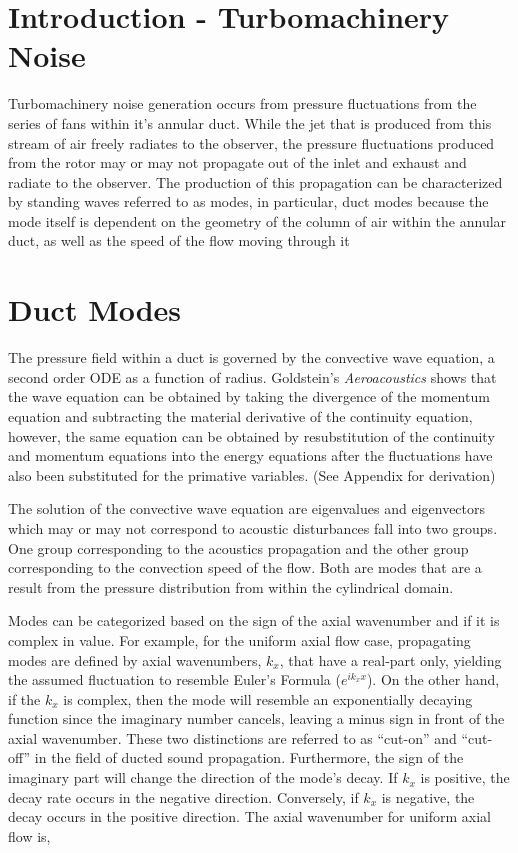 \documentclass[a4paper]{report}
\begin{document}
\section{Introduction - Turbomachinery Noise}
Turbomachinery noise generation occurs from pressure fluctuations from the series 
of fans within it's annular duct. While the jet that is produced from this stream
of air freely radiates to the observer, the pressure fluctuations 
produced from the rotor may or may not propagate out of the inlet and exhaust and 
radiate to the observer. The production of this propagation can be characterized
by standing waves referred to as modes, in particular, duct modes because 
the mode itself is dependent on the geometry of the column of air within the 
annular duct, as well as the speed of the flow moving through it

\section{Duct Modes}
The pressure field within a duct is governed by the convective wave equation, a
second order ODE as a function of radius. Goldstein's \textit{Aeroacoustics} 
shows that the wave equation can be obtained by taking the divergence of the
momentum equation and subtracting the material derivative of the continuity 
equation, however, the same equation can be obtained by resubstitution of the 
continuity and momentum equations into the energy equations after the fluctuations 
have also been substituted for the primative variables. (See Appendix for derivation)

The solution of the convective wave equation are eigenvalues and eigenvectors 
which may or may not correspond to acoustic disturbances fall into two groups.  
One group corresponding to the acoustics propagation and the other group 
corresponding to the convection speed of the flow. Both are modes that are a
result from the pressure distribution from within the cylindrical domain.  

Modes can be categorized based on the sign of the axial wavenumber and if it is
complex in value. For example, for the uniform axial flow case, propagating modes
are defined by axial wavenumbers, $k_x$, that have a real-part only, yielding 
the assumed fluctuation to resemble Euler's Formula ($e^{ik_x x}$). On the other 
hand, if the $k_x$ is complex, then the mode will resemble an exponentially decaying
function since the imaginary number cancels, leaving a minus sign in front of
the axial wavenumber. These two distinctions are referred to as ``cut-on'' and 
``cut-off'' in the field of ducted sound propagation. Furthermore, the sign of 
the imaginary part will change the direction of the mode's decay. If $k_x$ is 
positive, the decay rate occurs in the negative direction. Conversely, if $k_x$ 
is negative, the decay occurs in the positive direction. The axial wavenumber
for uniform axial flow is,
\end{document}
